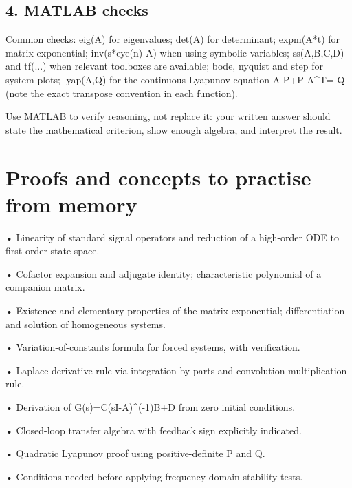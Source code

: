 \documentclass[11pt,a4paper]{article}
\begin{document}
\subsection{4. MATLAB checks}
\begin{conceptbox}Common checks: eig(A) for eigenvalues; det(A) for determinant; expm(A*t) for matrix exponential; inv(s*eye(n)-A) when using symbolic variables; ss(A,B,C,D) and tf(...) when relevant toolboxes are available; bode, nyquist and step for system plots; lyap(A,Q) for the continuous Lyapunov equation A P+P A\textasciicircum{}T=-Q (note the exact transpose convention in each function).\end{conceptbox}
\begin{conceptbox}Use MATLAB to verify reasoning, not replace it: your written answer should state the mathematical criterion, show enough algebra, and interpret the result.\end{conceptbox}

\section{Proofs and concepts to practise from memory}
\begin{studybox}• Linearity of standard signal operators and reduction of a high-order ODE to first-order state-space.\end{studybox}
\begin{studybox}• Cofactor expansion and adjugate identity; characteristic polynomial of a companion matrix.\end{studybox}
\begin{studybox}• Existence and elementary properties of the matrix exponential; differentiation and solution of homogeneous systems.\end{studybox}
\begin{studybox}• Variation-of-constants formula for forced systems, with verification.\end{studybox}
\begin{studybox}• Laplace derivative rule via integration by parts and convolution multiplication rule.\end{studybox}
\begin{studybox}• Derivation of G(s)=C(sI-A)\textasciicircum{}(-1)B+D from zero initial conditions.\end{studybox}
\begin{studybox}• Closed-loop transfer algebra with feedback sign explicitly indicated.\end{studybox}
\begin{studybox}• Quadratic Lyapunov proof using positive-definite P and Q.\end{studybox}
\begin{studybox}• Conditions needed before applying frequency-domain stability tests.\end{studybox}
\end{document}
